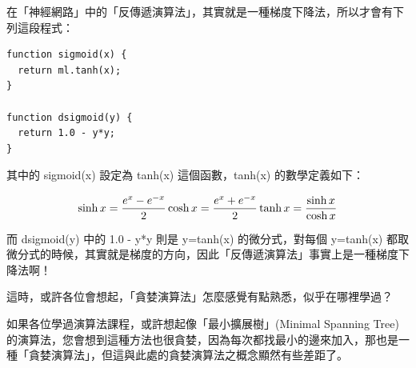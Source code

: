在「神經網路」中的「反傳遞演算法」，其實就是一種梯度下降法，所以才會有下列這段程式：

\begin{lstlisting}
function sigmoid(x) {
  return ml.tanh(x);
}

function dsigmoid(y) {
  return 1.0 - y*y;
}
\end{lstlisting}


其中的 sigmoid(x) 設定為 tanh(x) 這個函數，tanh(x) 的數學定義如下：

\begin{equation}
\sinh x = {{e^x  - e^{ - x} } \over 2} \\
\cosh x = {{e^x  + e^{ - x} } \over 2} \\
\tanh x = {{\sinh x} \over {\cosh x}}\\
\end{equation}

而 dsigmoid(y) 中的  1.0 - y*y  則是 y=tanh(x) 的微分式，對每個 y=tanh(x) 都取微分式的時候，其實就是梯度的方向，因此「反傳遞演算法」事實上是一種梯度下降法啊！

這時，或許各位會想起，「貪婪演算法」怎麼感覺有點熟悉，似乎在哪裡學過？

如果各位學過演算法課程，或許想起像「最小擴展樹」(Minimal Spanning Tree) 的演算法，您會想到這種方法也很貪婪，因為每次都找最小的邊來加入，那也是一種「貪婪演算法」，但這與此處的貪婪演算法之概念顯然有些差距了。
